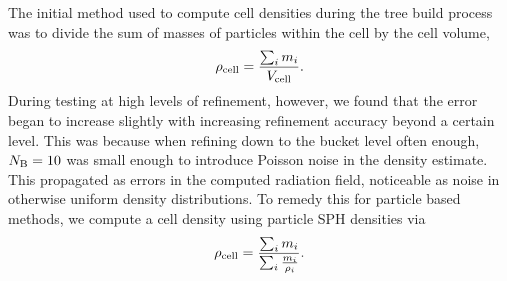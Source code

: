 \documentclass[fleq,usenatbib]{mnras}
\begin{document}
{The initial method used to compute cell densities during the tree build 
process was to divide the sum of masses of particles within the cell by the 
cell volume, 
\begin{equation}
\rho_{\rm cell} = \frac{\sum_i m_i}{V_{\rm cell}}.
\end{equation}
During testing at high levels of refinement, however, we found that the error 
began to increase slightly with increasing refinement accuracy beyond a 
certain level. This was because when refining down to the bucket level often 
enough, $N_{\rm B}=10$ was small enough to introduce Poisson noise in the density
estimate.  This propagated as errors
in the computed radiation field, noticeable as noise in otherwise uniform 
density distributions.  To remedy this for particle based methods, we compute a 
cell density using particle SPH densities via 
\begin{equation}
\rho_{\rm cell} = \frac{\sum_i m_i}{\sum_i{\frac{m_i}{\rho_i}}}.
\end{equation}

}
\end{document}
